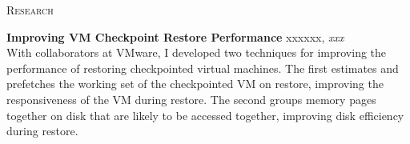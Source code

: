 \documentclass[10pt,times]{report}
\newlength{\sectiongap}
\newlength{\entrygap}
\newlength{\sectioncolwidth}
\newlength{\colgap}
\newlength{\stuffwidth}
\def\ifEqString#1#2{\def\testa{#1}\def\testb{#2}%
  \ifx\testa\testb}
\newenvironment{rtable}{
  \begin{minipage}{\textwidth}
  }{
  \end{minipage}
}
\newenvironment{rentry}[3][xxx]{
  \begin{minipage}[t]{\hsize}
    \textbf{#2}\ifEqString{#1}{xxx}\relax\else, \textit{#1}\fi
    \hspace{\stretch{1}} #3 \\
  }{
    \removelastskip
  \end{minipage}
  \\[\entrygap]  %
}
\newenvironment{rsection}[1]{
  \begin{minipage}[t]{\sectioncolwidth}
    \textsc{#1}
  \end{minipage}
  \hspace{\colgap}
  \begin{minipage}[t]{\stuffwidth}
  }{
    \removelastskip
  \end{minipage}
  \\[\sectiongap]
}
\begin{document}
\begin{rtable}
\begin{rsection}{Research}
    \begin{rentry}{Improving VM Checkpoint Restore Performance}{} 
      With collaborators at VMware, I developed two techniques for
      improving the performance of restoring checkpointed virtual
      machines. The first estimates and prefetches the working set of
      the checkpointed VM on restore, improving the responsiveness of
      the VM during restore. The second groups memory pages together
      on disk that are likely to be accessed together, improving disk
      efficiency during restore.
    \end{rentry}



        

\end{rsection}
\end{rtable}
\end{document}

